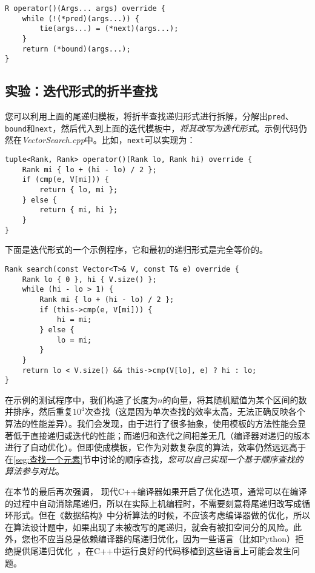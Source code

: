 \begin{lstlisting}
R operator()(Args... args) override {
    while (!(*pred)(args...)) {
        tie(args...) = (*next)(args...);
    }
    return (*bound)(args...);
}
\end{lstlisting}

\subsection{实验：迭代形式的折半查找}

您可以利用上面的尾递归模板，将折半查找递归形式进行拆解，分解出\lstinline{pred}、\lstinline{bound}和\lstinline{next}，然后代入到上面的迭代模板中，\textit{将其改写为迭代形式}。示例代码仍然在\textit{VectorSearch.cpp}中。比如，\lstinline{next}可以实现为：

\begin{lstlisting}
tuple<Rank, Rank> operator()(Rank lo, Rank hi) override {
    Rank mi { lo + (hi - lo) / 2 };
    if (cmp(e, V[mi])) {
        return { lo, mi };
    } else {
        return { mi, hi };
    }
}
\end{lstlisting}

下面是迭代形式的一个示例程序，它和最初的递归形式是完全等价的。
\begin{lstlisting}
Rank search(const Vector<T>& V, const T& e) override {
    Rank lo { 0 }, hi { V.size() };
    while (hi - lo > 1) {
        Rank mi { lo + (hi - lo) / 2 };
        if (this->cmp(e, V[mi])) {
            hi = mi;
        } else {
            lo = mi;
        }
    }
    return lo < V.size() && this->cmp(V[lo], e) ? hi : lo;
}
\end{lstlisting}

在示例的测试程序中，我们构造了长度为$n$的向量，将其随机赋值为某个区间的数并排序，然后重复$10^4$次查找（这是因为单次查找的效率太高，无法正确反映各个算法的性能差异）。我们会发现，由于进行了很多抽象，使用模板的方法性能会显著低于直接递归或迭代的性能；而递归和迭代之间相差无几（编译器对递归的版本进行了自动优化）。但即使成模板，它作为对数复杂度的算法，效率仍然远远高于在\ref{seg:查找一个元素}节中讨论的顺序查找，\textit{您可以自己实现一个基于顺序查找的算法参与对比}。

在本节的最后再次强调，
现代C++编译器如果开启了优化选项，通常可以在编译的过程中自动消除尾递归，所以在实际上机编程时，不需要刻意将尾递归改写成循环形式。但在《数据结构》中分析算法的时候，不应该考虑编译器做的优化，所以在算法设计题中，如果出现了未被改写的尾递归，就会有被扣空间分的风险。此外，您也不应当总是依赖编译器的尾递归优化，因为一些语言（比如Python）拒绝提供尾递归优化~\cite{van2012tail}，在C++中运行良好的代码移植到这些语言上可能会发生问题。

